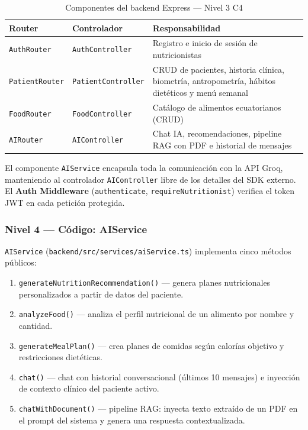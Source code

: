 \documentclass[12pt,a4paper]{article}
\begin{document}
\begin{table}[H]
\centering
\caption{Componentes del backend Express — Nivel 3 C4}
\label{tab:componentes}
\begin{tabularx}{\linewidth}{|l|l|X|}
\hline
\textbf{Router} & \textbf{Controlador} & \textbf{Responsabilidad} \\
\hline
\texttt{AuthRouter}    & \texttt{AuthController}    & Registro e inicio de sesión de nutricionistas \\
\hline
\texttt{PatientRouter} & \texttt{PatientController} & CRUD de pacientes, historia clínica, biometría, antropometría, hábitos dietéticos y menú semanal \\
\hline
\texttt{FoodRouter}    & \texttt{FoodController}    & Catálogo de alimentos ecuatorianos (CRUD) \\
\hline
\texttt{AIRouter}      & \texttt{AIController}      & Chat IA, recomendaciones, pipeline RAG con PDF e historial de mensajes \\
\hline
\end{tabularx}
\end{table}

El componente \texttt{AIService} encapsula toda la comunicación con la API Groq,
manteniendo al controlador \texttt{AIController} libre de los detalles del SDK externo.
El \textbf{Auth Middleware} (\texttt{authenticate}, \texttt{requireNutritionist})
verifica el token JWT en cada petición protegida.

\subsubsection{Nivel 4 — Código: AIService}

\texttt{AIService} (\texttt{backend/src/services/aiService.ts}) implementa cinco
métodos públicos:

\begin{enumerate}[leftmargin=2em]
  \item \texttt{generateNutritionRecommendation()} — genera planes nutricionales
        personalizados a partir de datos del paciente.
  \item \texttt{analyzeFood()} — analiza el perfil nutricional de un alimento por
        nombre y cantidad.
  \item \texttt{generateMealPlan()} — crea planes de comidas según calorías objetivo
        y restricciones dietéticas.
  \item \texttt{chat()} — chat con historial conversacional (últimos 10 mensajes)
        e inyección de contexto clínico del paciente activo.
  \item \texttt{chatWithDocument()} — pipeline RAG: inyecta texto extraído de un PDF
        en el prompt del sistema y genera una respuesta contextualizada.
\end{enumerate}
\end{document}
